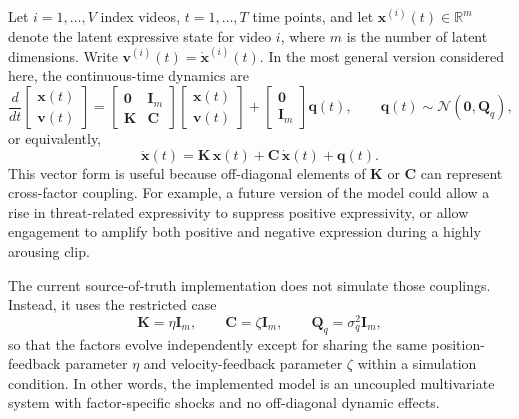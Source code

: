 \documentclass[10pt]{article}
\begin{document}
Let $i=1,\dots,V$ index videos, $t=1,\dots,T$ time points, and let $\bm x^{(i)}(t)\in\mathbb R^m$ denote the latent expressive state for video $i$, where $m$ is the number of latent dimensions. Write $\bm v^{(i)}(t)=\dot{\bm x}^{(i)}(t)$. In the most general version considered here, the continuous-time dynamics are
\begin{equation}
\frac{d}{dt}
\begin{bmatrix}
 \bm x(t)\\ \bm v(t)
\end{bmatrix}
=
\begin{bmatrix}
 \bm 0 & \bm I_m\\
 \bm K & \bm C
\end{bmatrix}
\begin{bmatrix}
 \bm x(t)\\ \bm v(t)
\end{bmatrix}
+
\begin{bmatrix}
 \bm 0\\ \bm I_m
\end{bmatrix}
\bm q(t),
\qquad
\bm q(t)\sim \mathcal N(\bm 0,\bm Q_q),
\label{eq:vector}
\end{equation}
or equivalently,
\begin{equation}
\ddot{\bm x}(t)=\bm K\,\bm x(t)+\bm C\,\dot{\bm x}(t)+\bm q(t).
\label{eq:vector_secondorder}
\end{equation}
This vector form is useful because off-diagonal elements of $\bm K$ or $\bm C$ can represent cross-factor coupling. For example, a future version of the model could allow a rise in threat-related expressivity to suppress positive expressivity, or allow engagement to amplify both positive and negative expression during a highly arousing clip.

The current source-of-truth implementation does not simulate those couplings. Instead, it uses the restricted case
\[
\bm K=\eta \bm I_m,
\qquad
\bm C=\zeta \bm I_m,
\qquad
\bm Q_q=\sigma_q^2 \bm I_m,
\]
so that the factors evolve independently except for sharing the same position-feedback parameter $\eta$ and velocity-feedback parameter $\zeta$ within a simulation condition. In other words, the implemented model is an uncoupled multivariate system with factor-specific shocks and no off-diagonal dynamic effects.
\end{document}
